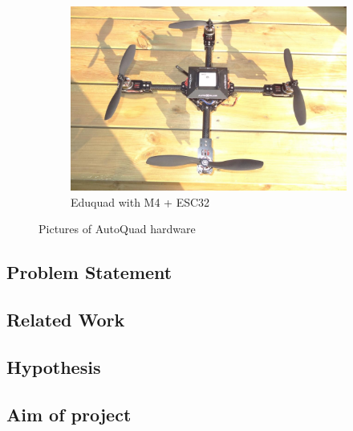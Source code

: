 \begin{figure}[H]
    \begin{subfigure}[b]{0.3\textwidth}
        \includegraphics[width=\textwidth]{graphics/eduquad.jpg}
        \caption{Eduquad with M4 + ESC32}
        \label{fig:mouse}
    \end{subfigure}
    \caption{Pictures of AutoQuad hardware}\label{fig:AQ_hw}
\end{figure} 



\newpage
\subsection{Problem Statement}

\subsection{Related Work}

\subsection{Hypothesis}

\subsection{Aim of project}


